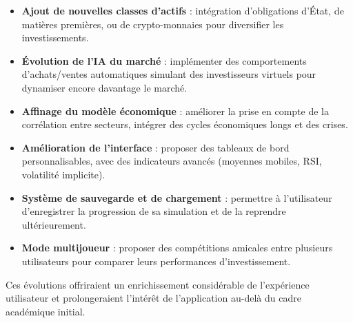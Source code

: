 \begin{itemize}
    \item \textbf{Ajout de nouvelles classes d'actifs} : intégration d'obligations d'État, de matières premières, ou de crypto-monnaies pour diversifier les investissements.
    \item \textbf{Évolution de l'IA du marché} : implémenter des comportements d'achats/ventes automatiques simulant des investisseurs virtuels pour dynamiser encore davantage le marché.
    \item \textbf{Affinage du modèle économique} : améliorer la prise en compte de la corrélation entre secteurs, intégrer des cycles économiques longs et des crises.
    \item \textbf{Amélioration de l'interface} : proposer des tableaux de bord personnalisables, avec des indicateurs avancés (moyennes mobiles, RSI, volatilité implicite).
    \item \textbf{Système de sauvegarde et de chargement} : permettre à l'utilisateur d'enregistrer la progression de sa simulation et de la reprendre ultérieurement.
    \item \textbf{Mode multijoueur} : proposer des compétitions amicales entre plusieurs utilisateurs pour comparer leurs performances d'investissement.
\end{itemize}

Ces évolutions offriraient un enrichissement considérable de l'expérience utilisateur et prolongeraient l'intérêt de l'application au-delà du cadre académique initial.
